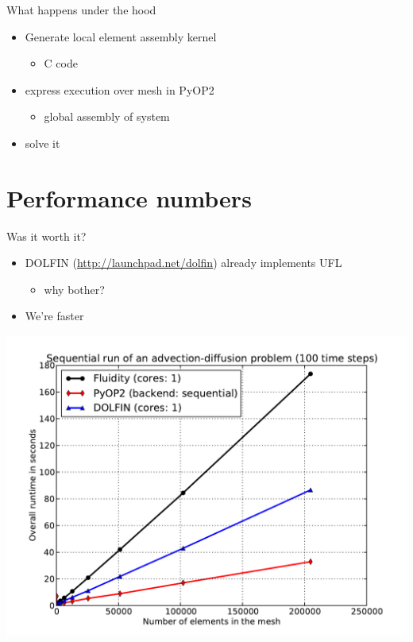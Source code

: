 \documentclass[bigger]{beamer}
\begin{document}
\begin{frame}[label={sec:orgheadline13}]{What happens under the hood}
\begin{itemize}
\item Generate local element assembly kernel
\begin{itemize}
\item C code
\end{itemize}
\item express execution over mesh in PyOP2
\begin{itemize}
\item global assembly of system
\end{itemize}
\item solve it
\end{itemize}
\end{frame}

\section{Performance numbers}
\label{sec:orgheadline19}

\begin{frame}[label={sec:orgheadline15}]{Was it worth it?}
\begin{itemize}
\item DOLFIN (\url{http://launchpad.net/dolfin}) already implements UFL
\begin{itemize}
\item why bother?
\end{itemize}
\item We're faster
\end{itemize}
\begin{center}
\includegraphics[width=.9\linewidth]{09-19-Moscow-PyOP2.figures/sequential.pdf}
\end{center}
\end{frame}
\end{document}
